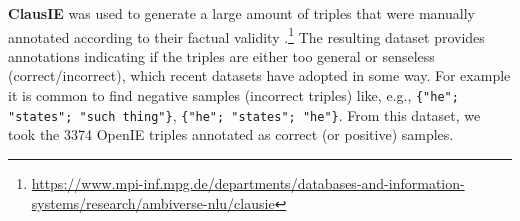 \documentclass[preprint]{elsarticle}
\begin{document}









\textbf{ClausIE} was used to generate a large amount of triples that were manually annotated according to their factual validity \cite{10.1145/2488388.2488420}.\footnote{\url{https://www.mpi-inf.mpg.de/departments/databases-and-information-systems/research/ambiverse-nlu/clausie}
} The resulting dataset provides annotations indicating if the triples are either too general or senseless (correct/incorrect), which recent datasets have adopted in some way. For example it is common to find negative samples (incorrect triples) like, e.g., \texttt{\{"he"; "states"; "such thing"\}}, \texttt{\{"he"; "states"; "he"\}}. From this dataset, we took the 3374 OpenIE triples annotated as correct (or positive) samples.
\end{document}
